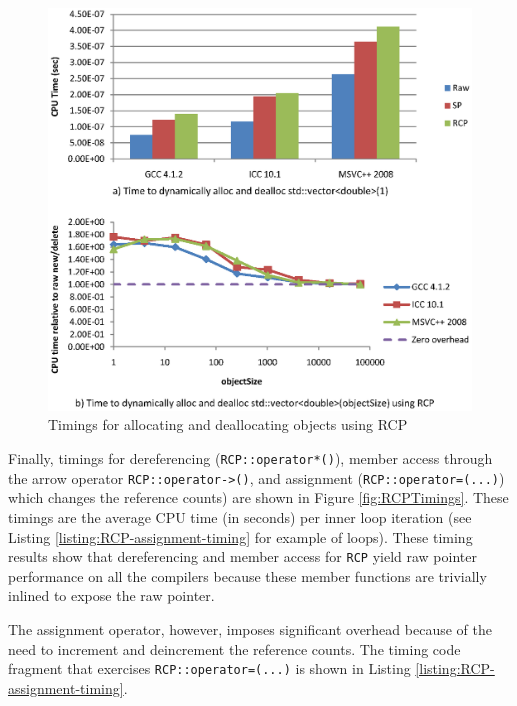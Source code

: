 \documentclass[pdf,ps2pdf,11pt]{SANDreport}
\begin{document}
{\bsinglespace
\begin{figure}
\begin{center}
\includegraphics*[angle=0,scale=1.00]{RCPAllocTimings}
\end{center}
\caption{
\label{fig:RCPAllocTimings}
Timings for allocating and deallocating objects using RCP}
\end{figure}
\esinglespace}


Finally, timings for dereferencing ({}\texttt{RCP::operator*()}),
member access through the arrow operator
{}\texttt{RCP::operator->()}, and assignment
({}\texttt{RCP::operator=(...)}) which changes the reference counts)
are shown in Figure {}\ref{fig:RCPTimings}.  These timings are the
average CPU time (in seconds) per inner loop iteration (see Listing
{}\ref{listing:RCP-assignment-timing} for example of loops).  These
timing results show that dereferencing and member access for
{}\texttt{RCP} yield raw pointer performance on all the compilers
because these member functions are trivially inlined to expose the raw
pointer.

The assignment operator, however, imposes significant overhead because
of the need to increment and deincrement the reference counts.  The
timing code fragment that exercises {}\texttt{RCP::operator=(...)} is
shown in Listing {}\ref{listing:RCP-assignment-timing}.
\end{document}

